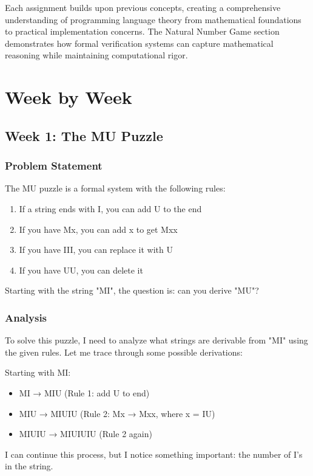\documentclass{article}
\theoremstyle{plain}
\theoremstyle{definition}
\theoremstyle{remark}
\begin{document}
Each assignment builds upon previous concepts, creating a comprehensive understanding of programming language theory from mathematical foundations to practical implementation concerns. The Natural Number Game section demonstrates how formal verification systems can capture mathematical reasoning while maintaining computational rigor.

\section{Week by Week}\label{homework}

\subsection{Week 1: The MU Puzzle}

\subsubsection{Problem Statement}

The MU puzzle is a formal system with the following rules:
\begin{enumerate}
\item If a string ends with I, you can add U to the end
\item If you have Mx, you can add x to get Mxx
\item If you have III, you can replace it with U
\item If you have UU, you can delete it
\end{enumerate}

Starting with the string "MI", the question is: can you derive "MU"?

\subsubsection{Analysis}

To solve this puzzle, I need to analyze what strings are derivable from "MI" using the given rules. Let me trace through some possible derivations:

Starting with MI:
\begin{itemize}
\item MI → MIU (Rule 1: add U to end)
\item MIU → MIUIU (Rule 2: Mx → Mxx, where x = IU)
\item MIUIU → MIUIUIU (Rule 2 again)
\end{itemize}

I can continue this process, but I notice something important: the number of I's in the string.
\end{document}
